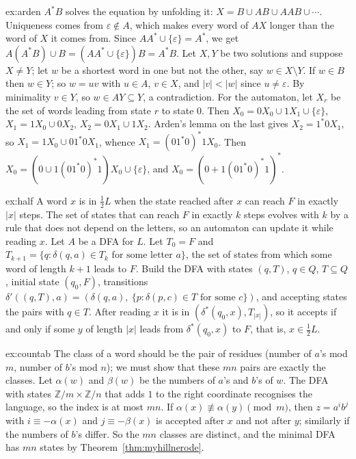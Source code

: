 \begin{solution}{ex:arden}
\idea $A^*B$ solves the equation by unfolding it: $X=B\cup AB\cup AAB\cup\cdots$. Uniqueness comes from $\varepsilon\notin A$, which makes every word of $AX$ longer than the word of $X$ it comes from.
\writeup Since $AA^*\cup\{\varepsilon\}=A^*$, we get $A(A^*B)\cup B=(AA^*\cup\{\varepsilon\})B=A^*B$. Let $X,Y$ be two solutions and suppose $X\ne Y$; let $w$ be a shortest word in one but not the other, say $w\in X\setminus Y$. If $w\in B$ then $w\in Y$; so $w=uv$ with $u\in A$, $v\in X$, and $|v|<|w|$ since $u\ne\varepsilon$. By minimality $v\in Y$, so $w\in AY\subseteq Y$, a contradiction.
For the automaton, let $X_r$ be the set of words leading from state $r$ to state $0$. Then $X_0=0X_0\cup1X_1\cup\{\varepsilon\}$, $X_1=1X_0\cup0X_2$, $X_2=0X_1\cup1X_2$. Arden's lemma on the last gives $X_2=1^*0X_1$, so $X_1=1X_0\cup01^*0X_1$, whence $X_1=(01^*0)^*1X_0$. Then $X_0=(0\cup1(01^*0)^*1)X_0\cup\{\varepsilon\}$, and $X_0=(0+1(01^*0)^*1)^*$.
\end{solution}

\begin{solution}{ex:half}
\idea A word $x$ is in $\frac12L$ when the state reached after $x$ can reach $F$ in exactly $|x|$ steps. The set of states that can reach $F$ in exactly $k$ steps evolves with $k$ by a rule that does not depend on the letters, so an automaton can update it while reading $x$.
\writeup Let $A$ be a DFA for $L$. Let $T_0=F$ and $T_{k+1}=\{q:\delta(q,a)\in T_k\text{ for some letter }a\}$, the set of states from which some word of length $k+1$ leads to $F$. Build the DFA with states $(q,T)$, $q\in Q$, $T\subseteq Q$, initial state $(q_0,F)$, transitions $\delta'((q,T),a)=(\delta(q,a),\ \{p:\delta(p,c)\in T\text{ for some }c\})$, and accepting states the pairs with $q\in T$. After reading $x$ it is in $(\delta^*(q_0,x),T_{|x|})$, so it accepts if and only if some $y$ of length $|x|$ leads from $\delta^*(q_0,x)$ to $F$, that is, $x\in\frac12L$.
\end{solution}

\begin{solution}{ex:countab}
\idea The class of a word should be the pair of residues (number of $a$'s mod $m$, number of $b$'s mod $n$); we must show that these $mn$ pairs are exactly the classes.
\writeup Let $\alpha(w)$ and $\beta(w)$ be the numbers of $a$'s and $b$'s of $w$. The DFA with states $\mathbb Z/m\times\mathbb Z/n$ that adds $1$ to the right coordinate recognises the language, so the index is at most $mn$. If $\alpha(x)\not\equiv\alpha(y)\pmod m$, then $z=a^ib^j$ with $i\equiv-\alpha(x)$ and $j\equiv-\beta(x)$ is accepted after $x$ and not after $y$; similarly if the numbers of $b$'s differ. So the $mn$ classes are distinct, and the minimal DFA has $mn$ states by Theorem~\ref{thm:myhillnerode}.
\end{solution}


